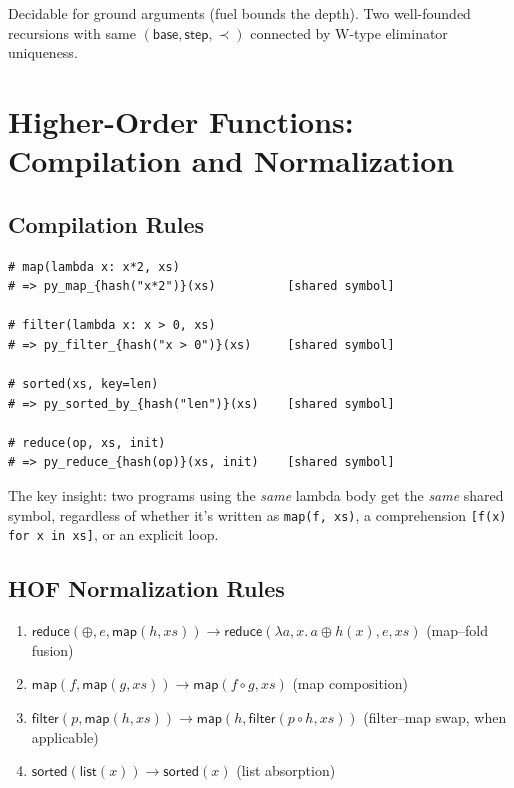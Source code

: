 Decidable for ground arguments (fuel bounds the depth).  Two
well-founded recursions with same $(\mathsf{base}, \mathsf{step},
\prec)$ connected by W-type eliminator uniqueness.


\chapter{Higher-Order Functions: Compilation and Normalization}
\label{ch:hof-practice}

\section{Compilation Rules}

\begin{lstlisting}[caption={HOF compilation}]
# map(lambda x: x*2, xs)
# => py_map_{hash("x*2")}(xs)          [shared symbol]

# filter(lambda x: x > 0, xs)
# => py_filter_{hash("x > 0")}(xs)     [shared symbol]

# sorted(xs, key=len)
# => py_sorted_by_{hash("len")}(xs)    [shared symbol]

# reduce(op, xs, init)
# => py_reduce_{hash(op)}(xs, init)    [shared symbol]
\end{lstlisting}

The key insight: two programs using the \emph{same} lambda body get
the \emph{same} shared symbol, regardless of whether it's written as
\texttt{map(f, xs)}, a comprehension \texttt{[f(x) for x in xs]}, or
an explicit loop.

\section{HOF Normalization Rules}

\begin{enumerate}
  \item $\mathsf{reduce}(\oplus, e, \mathsf{map}(h, xs)) \to
    \mathsf{reduce}(\lambda a,x.\, a \oplus h(x), e, xs)$
    \hfill (map--fold fusion)
  \item $\mathsf{map}(f, \mathsf{map}(g, xs)) \to
    \mathsf{map}(f \circ g, xs)$
    \hfill (map composition)
  \item $\mathsf{filter}(p, \mathsf{map}(h, xs)) \to
    \mathsf{map}(h, \mathsf{filter}(p \circ h, xs))$
    \hfill (filter--map swap, when applicable)
  \item $\mathsf{sorted}(\mathsf{list}(x)) \to \mathsf{sorted}(x)$
    \hfill (list absorption)
\end{enumerate}

